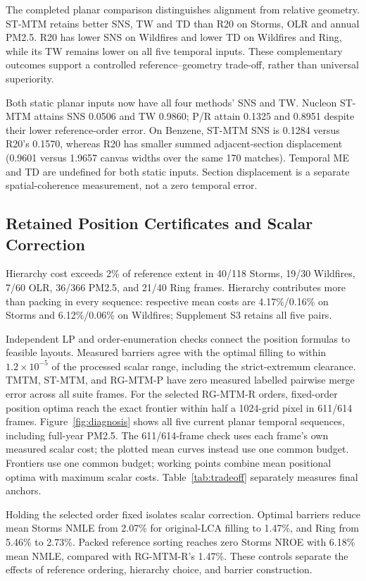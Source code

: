 The completed planar comparison distinguishes alignment from relative geometry. ST-MTM retains better SNS, TW and TD than R20 on Storms, OLR and annual PM2.5. R20 has lower SNS on Wildfires and lower TD on Wildfires and Ring, while its TW remains lower on all five temporal inputs. These complementary outcomes support a controlled reference--geometry trade-off, rather than universal superiority.

Both static planar inputs now have all four methods' SNS and TW. Nucleon ST-MTM attains SNS 0.0506 and TW 0.9860; P/R attain 0.1325 and 0.8951 despite their lower reference-order error. On Benzene, ST-MTM SNS is 0.1284 versus R20's 0.1570, whereas R20 has smaller summed adjacent-section displacement (0.9601 versus 1.9657 canvas widths over the same 170 matches). Temporal ME and TD are undefined for both static inputs. Section displacement is a separate spatial-coherence measurement, not a zero temporal error.



\subsection{Retained Position Certificates and Scalar Correction}

Hierarchy cost exceeds 2\% of reference extent in 40/118 Storms, 19/30 Wildfires, 7/60 OLR, 36/366 PM2.5, and 21/40 Ring frames. Hierarchy contributes more than packing in every sequence: respective mean costs are 4.17\%/0.16\% on Storms and 6.12\%/0.06\% on Wildfires; Supplement S3 retains all five pairs.

Independent LP and order-enumeration checks connect the position formulas to feasible layouts. Measured barriers agree with the optimal filling to within $1.2\times10^{-5}$ of the processed scalar range, including the strict-extremum clearance. TMTM, ST-MTM, and RG-MTM-P have zero measured labelled pairwise merge error across all suite frames. For the selected RG-MTM-R orders, fixed-order position optima reach the exact frontier within half a 1024-grid pixel in 611/614 frames. Figure~\ref{fig:diagnosis} shows all five current planar temporal sequences, including full-year PM2.5. The 611/614-frame check uses each frame's own measured scalar cost; the plotted mean curves instead use one common budget. Frontiers use one common budget; working points combine mean positional optima with maximum scalar costs. Table~\ref{tab:tradeoff} separately measures final anchors.

Holding the selected order fixed isolates scalar correction. Optimal barriers reduce mean Storms NMLE from 2.07\% for original-LCA filling to 1.47\%, and Ring from 5.46\% to 2.73\%. Packed reference sorting reaches zero Storms NROE with 6.18\% mean NMLE, compared with RG-MTM-R's 1.47\%. These controls separate the effects of reference ordering, hierarchy choice, and barrier construction.

